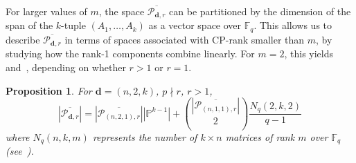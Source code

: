 \documentclass[a4paper]{cas-sc}
\newcommand{\dd}{\mathbf{d}}    %
\newcommand{\F}{\mathbb{F}}
\newtheorem{proposition}[theorem]{Proposition}
\begin{document}
    For larger values of $m$, the space $\overline{\mathcal{P}_{\dd,r}}$ can be partitioned by the dimension of the span of the $k$-tuple $(A_1,\dots,A_k)$ as a vector space over $\F_q$. This allows us to describe $\overline{\mathcal{P}_{\dd,r}}$ in terms of spaces associated with CP-rank smaller than $m$, by studying how the rank-1 components combine linearly. For $m = 2$, this yields~ and~, depending on whether $r>1$ or $r = 1$.
    \begin{proposition}\label{prop: (n_2_k)-r>1}
        For $\dd = (n,2,k)$, $p \nmid r$, $r > 1$,
        \begin{equation} \label{eq: (n_2_k)-r>1}
            \left|\overline{\mathcal{P}_{\dd, r}}\right| = \left|\overline{\mathcal{P}_{(n,2,1), r}}\right| \left|\mathbb{P}^{k-1}\right| + \binom{\left|\overline{\mathcal{P}_{(n,1,1), r}}\right|}{2}\frac{N_{q}(2,k,2)}{q-1}
        \end{equation}
        where $N_q(n,k,m)$ represents the number of $k\times n$ matrices of rank $m$ over $\F_q$ (see~).
    \end{proposition} 
\end{document}
